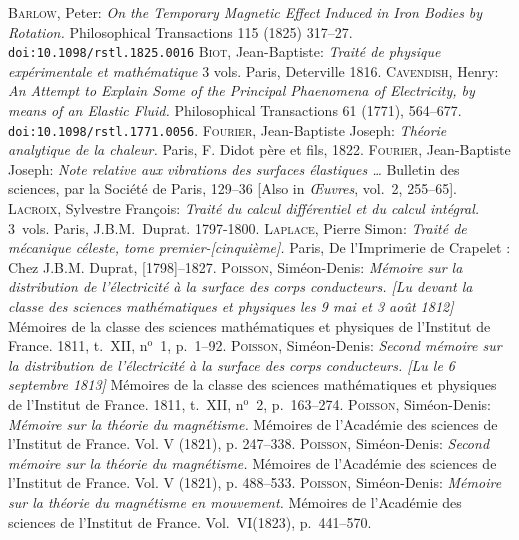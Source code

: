 \documentclass[12pt,notitlepage]{amsart}
\let\Author\textsc
\let\Title\textit
\begin{document}
\begin{thebibliography}{9}
 \Author{Barlow}, Peter: \Title{On the Temporary Magnetic Effect 
Induced in Iron Bodies by Rotation.} Philosophical Transactions 115 (1825) 317--27. \texttt{doi:10.1098/rstl.1825.0016}
 \Author{Biot}, Jean-Baptiste: \Title{Trait\'e de physique 
exp\'erimentale et math\'ematique} 3 vols. Paris, Deterville 1816.
 \Author{Cavendish}, Henry: \Title{An Attempt to Explain Some of the
Principal Phaenomena of Electricity, by means of an Elastic Fluid.}
Philosophical Transactions 61 (1771), 564--677.
\texttt{doi:10.1098/rstl.1771.0056}.
 \Author{Fourier}, Jean-Baptiste Joseph: \Title{Th\'eorie analytique
de la chaleur.} Paris, F. Didot p\`ere et fils, 1822.
 \Author{Fourier}, Jean-Baptiste Joseph: \Title{Note relative aux
vibrations des surfaces \'elastiques \ldots} Bulletin des sciences, par la
Soci\'et\'e de Paris, 129--36 [Also in \Title{\OE{}uvres}, vol.~2, 255--65].
 \Author{Lacroix}, Sylvestre Fran\c{c}ois: \Title{Trait\'e du 
calcul diff\'erentiel et du calcul int\'egral.} 3~vols. Paris, J.B.M.~Duprat.
1797-1800.
 \Author{Laplace}, Pierre Simon: \Title{Trait\'e de m\'ecanique
c\'eleste, tome premier-[cinqui\`eme].} Paris, De l'Imprimerie de Crapelet :
Chez J.B.M. Duprat, [1798]--1827.
 \Author{Poisson}, Sim\'eon-Denis: \Title{M\'emoire sur la
distribution de l'\'electricit\'e \`a la surface des corps conducteurs.
[Lu devant la classe des sciences math\'ematiques et physiques les 9 mai
et 3 ao\^ut 1812]}
M\'emoires de la classe des sciences math\'ematiques et physiques de l'Institut
de France. 1811, t.~XII, n${}^\text{o}$~1, p.~1--92.
 \Author{Poisson}, Sim\'eon-Denis: \Title{Second m\'emoire sur la 
distribution  de l'\'electricit\'e \`a la surface des corps conducteurs.
[Lu le 6 septembre 1813]}
M\'emoires de la classe des sciences math\'ematiques et physiques de l'Institut
de France. 1811, t.~XII, n${}^\text{o}$~2, p.~163--274.
 \Author{Poisson}, Sim\'eon-Denis: \Title{M\'emoire sur la th\'eorie du 
magn\'etisme.} M\'emoires de l'Acad\'emie des sciences de l'Institut de France. Vol. V (1821), p. 247--338.
 \Author{Poisson}, Sim\'eon-Denis: \Title{Second m\'emoire sur la th\'eorie du 
magn\'etisme.} M\'emoires de l'Acad\'emie des sciences de l'Institut de France. Vol. V (1821), p. 488--533.
 \Author{Poisson}, Sim\'eon-Denis: \Title{M\'emoire sur la 
th\'eorie du magn\'etisme en mouvement.} M\'emoires de l'Acad\'emie des sciences de l'Institut de France. Vol.~VI(1823), p.~441--570.
\end{thebibliography}
\end{document}
